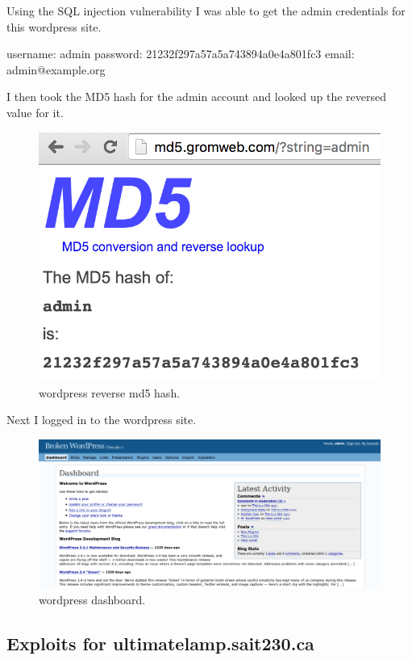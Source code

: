 \documentclass{article}
\begin{document}
Using the SQL injection vulnerability I was able to get the admin credentials for this wordpress site.\ 

username: admin
password: 21232f297a57a5a743894a0e4a801fc3
email: admin@example.org

\newpage
I then took the MD5 hash for the admin account and looked up the reversed value for it.

\begin{figure}[h!]
	\includegraphics[width=\linewidth]{images/wp-admin-md5.png}
	\caption{wordpress reverse md5 hash.}
	\label{fig:wordpress3}
\end{figure}

\newpage
Next I logged in to the wordpress site.

\begin{figure}[h!]
	\includegraphics[width=\linewidth]{images/wp-logged-in.png}
	\caption{wordpress dashboard.}
	\label{fig:wordpress4}
\end{figure}

\newpage
\subsection{Exploits for ultimatelamp.sait230.ca}
\end{document}
